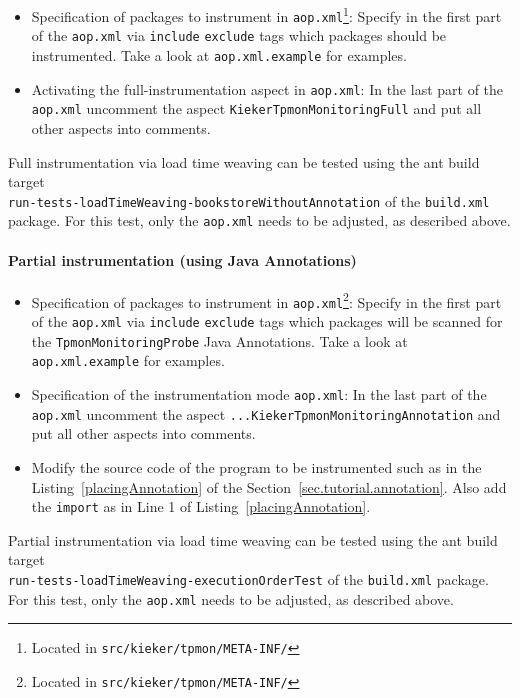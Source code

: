 \documentclass[a4paper,12pt]{scrartcl}
\begin{document}
\begin{itemize}
 \item Specification of packages to instrument in \texttt{aop.xml}\footnote{Located in \texttt{src/kieker/tpmon/META-INF/}}: Specify in the first part of the \texttt{aop.xml} via \texttt{include} \texttt{exclude} tags which packages should be instrumented. Take a look at  \texttt{aop.xml.example} for examples.
\item Activating the full-instrumentation aspect in \texttt{aop.xml}: In the last part of the \texttt{aop.xml} uncomment the aspect \texttt{KiekerTpmonMonitoringFull} and put all other aspects into comments.
\end{itemize}



Full instrumentation via load time weaving can be tested using the ant build target \\ \small \texttt{run-tests-loadTimeWeaving-bookstoreWithoutAnnotation} \normalsize of the \texttt{build.xml} \tpmon{} package. For this test, only the \texttt{aop.xml} needs to be adjusted, as described above.

\paragraph{Partial instrumentation (using Java Annotations)}
\begin{itemize}
 \item Specification of packages to instrument in \texttt{aop.xml}\footnote{Located in \texttt{src/kieker/tpmon/META-INF/}}: Specify in the first part of the \texttt{aop.xml} via \texttt{include} \texttt{exclude} tags which packages will be scanned for the \texttt{TpmonMonitoringProbe} Java Annotations. Take a look at  \texttt{aop.xml.example} for examples.
\item Specification of the instrumentation mode \texttt{aop.xml}: In the last part of the \texttt{aop.xml} uncomment the aspect \texttt{...KiekerTpmonMonitoringAnnotation} and put all other aspects into comments.
\item Modify the source code of the program to be instrumented such as in the Listing~\ref{placingAnnotation} of the Section~\ref{sec.tutorial.annotation}. Also add the \texttt{import} as in Line 1 of Listing~\ref{placingAnnotation}.
\end{itemize}

Partial instrumentation via load time weaving can be tested using the ant build target \\ \small \texttt{run-tests-loadTimeWeaving-executionOrderTest} \normalsize of the \texttt{build.xml} \tpmon{} package. For this test, only the \texttt{aop.xml} needs to be adjusted, as described above.
\end{document}
